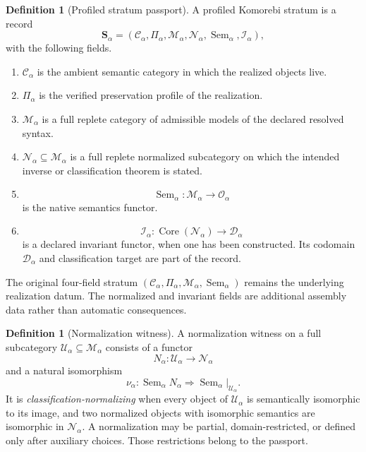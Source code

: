 \documentclass[11pt]{article}
\theoremstyle{definition}
\newtheorem{definition}[theorem]{Definition}
\theoremstyle{remark}
\DeclareMathOperator{\Core}{Core}
\DeclareMathOperator{\Sem}{Sem}
\begin{document}
\begin{definition}[Profiled stratum passport]
\label{def:profiled-stratum-passport}
A profiled Komorebi stratum is a record
\[
\mathbf S_\alpha
=
(\mathcal C_\alpha,\Pi_\alpha,\mathcal M_\alpha,
 \mathcal N_\alpha,\Sem_\alpha,\mathcal I_\alpha),
\]
with the following fields.
\begin{enumerate}[label=\textup{(\roman*)}]
\item \(\mathcal C_\alpha\) is the ambient semantic category in which the realized objects live.
\item \(\Pi_\alpha\) is the verified preservation profile of the realization.
\item \(\mathcal M_\alpha\) is a full replete category of admissible models of the declared resolved syntax.
\item \(\mathcal N_\alpha\subseteq\mathcal M_\alpha\) is a full replete normalized subcategory on which the intended inverse or classification theorem is stated.
\item
\[
\Sem_\alpha:\mathcal M_\alpha\longrightarrow\mathcal O_\alpha
\]
is the native semantics functor.
\item
\[
\mathcal I_\alpha:\Core(\mathcal N_\alpha)\longrightarrow\mathcal D_\alpha
\]
is a declared invariant functor, when one has been constructed.  Its codomain \(\mathcal D_\alpha\) and classification target are part of the record.
\end{enumerate}
The original four-field stratum
\((\mathcal C_\alpha,\Pi_\alpha,\mathcal M_\alpha,\Sem_\alpha)\)
remains the underlying realization datum.  The normalized and invariant fields are additional assembly data rather than automatic consequences.
\end{definition}

\begin{definition}[Normalization witness]
\label{def:normalization-witness}
A normalization witness on a full subcategory \(\mathcal U_\alpha\subseteq\mathcal M_\alpha\) consists of a functor
\[
N_\alpha:\mathcal U_\alpha\longrightarrow\mathcal N_\alpha
\]
and a natural isomorphism
\[
\nu_\alpha:\Sem_\alpha N_\alpha
\Longrightarrow
\Sem_\alpha|_{\mathcal U_\alpha}.
\]
It is \emph{classification-normalizing} when every object of \(\mathcal U_\alpha\) is semantically isomorphic to its image, and two normalized objects with isomorphic semantics are isomorphic in \(\mathcal N_\alpha\).  A normalization may be partial, domain-restricted, or defined only after auxiliary choices.  Those restrictions belong to the passport.
\end{definition}
\end{document}
